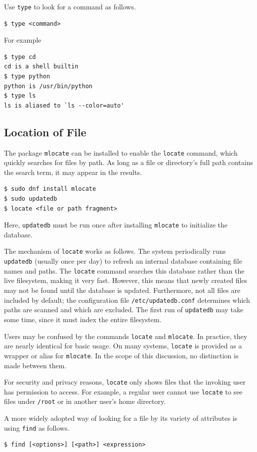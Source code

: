 Use \verb|type| to look for a command as follows.
\begin{lstlisting}
$ type <command>
\end{lstlisting}

For example
\begin{lstlisting}
$ type cd
cd is a shell builtin
$ type python
python is /usr/bin/python
$ type ls
ls is aliased to `ls --color=auto'
\end{lstlisting}

\subsection{Location of File}

The package \verb|mlocate| can be installed to enable the \verb|locate| command, which quickly searches for files by path. As long as a file or directory’s full path contains the search term, it may appear in the results.
\begin{lstlisting}
$ sudo dnf install mlocate
$ sudo updatedb
$ locate <file or path fragment>
\end{lstlisting}
Here, \verb|updatedb| must be run once after installing \verb|mlocate| to initialize the database.

The mechanism of \verb|locate| works as follows. The system periodically runs \verb|updatedb| (usually once per day) to refresh an internal database containing file names and paths. The \verb|locate| command searches this database rather than the live filesystem, making it very fast. However, this means that newly created files may not be found until the database is updated. Furthermore, not all files are included by default; the configuration file \verb|/etc/updatedb.conf| determines which paths are scanned and which are excluded. The first run of \verb|updatedb| may take some time, since it must index the entire filesystem.

Users may be confused by the commands \verb|locate| and \verb|mlocate|. In practice, they are nearly identical for basic usage. On many systems, \verb|locate| is provided as a wrapper or alias for \verb|mlocate|. In the scope of this discussion, no distinction is made between them.

For security and privacy reasons, \verb|locate| only shows files that the invoking user has permission to access. For example, a regular user cannot use \verb|locate| to see files under \verb|/root| or in another user’s home directory.

A more widely adopted way of looking for a file by its variety of attributes is using \verb|find| as follows.
\begin{lstlisting}
$ find [<options>] [<path>] <expression>
\end{lstlisting}

